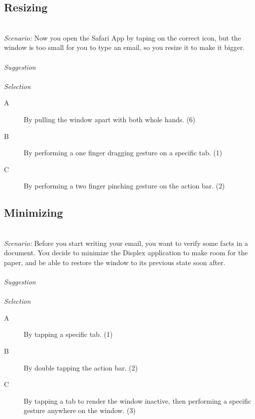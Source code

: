 \documentclass[11pt]{amsart}
\begin{document}

\subsection{Resizing}
\hfill\\
\emph{Scenario:}
Now you open the Safari App by taping on the correct icon, but the window is too small for you to type an email, so you resize it to make it bigger.
\\\\
\emph{Suggestion}
\\\\
\emph{Selection}
\begin{description}
\item[A]{By pulling the window apart with both whole hands. (6)}
\item[B]{By performing a one finger dragging gesture on a specific tab. (1)}
\item[C]{By performing a two finger pinching gesture on the action bar. (2)}
\end{description}



\subsection{Minimizing}
\hfill\\
\emph{Scenario:}
Before you start writing your email, you want to verify some facts in a document.
You decide to minimize the Displex application to make room for the paper, and be able to restore the window to its previous state soon after.
\\\\
\emph{Suggestion}
\\\\
\emph{Selection}
\begin{description}
\item[A]{By tapping a specific tab. (1)}
\item[B]{By double tapping the action bar. (2)}
\item[C]{By tapping a tab to render the window inactive, then performing a specific gesture anywhere on the window. (3)}
\end{description}

\end{document}
